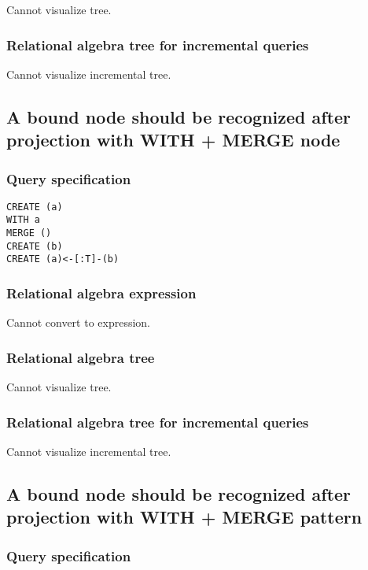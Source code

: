 Cannot visualize tree.

\subsubsection*{Relational algebra tree for incremental queries}

Cannot visualize incremental tree.

\subsection{A bound node should be recognized after projection with WITH + MERGE node}

\subsubsection*{Query specification}

\begin{lstlisting}
CREATE (a)
WITH a
MERGE ()
CREATE (b)
CREATE (a)<-[:T]-(b)
\end{lstlisting}

\subsubsection*{Relational algebra expression}

Cannot convert to expression.

\subsubsection*{Relational algebra tree}

Cannot visualize tree.

\subsubsection*{Relational algebra tree for incremental queries}

Cannot visualize incremental tree.

\subsection{A bound node should be recognized after projection with WITH + MERGE pattern}

\subsubsection*{Query specification}

